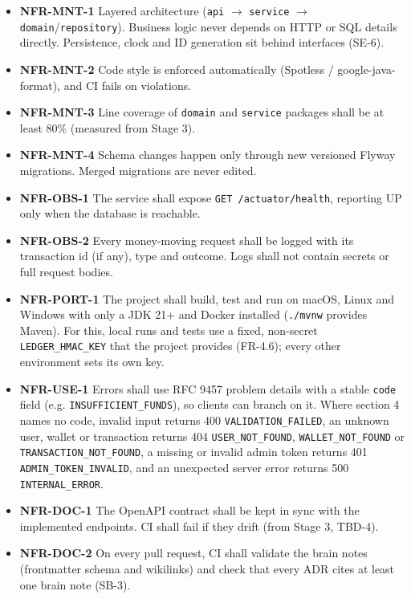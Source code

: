 \documentclass[11pt,a4paper]{article}
\providecommand{\tightlist}{\setlength{\itemsep}{2pt}\setlength{\parskip}{0pt}}
\begin{document}
\begin{itemize}
\tightlist
\item
  \textbf{NFR-MNT-1} Layered architecture (\texttt{api} \ensuremath{\rightarrow} \texttt{service} \ensuremath{\rightarrow} \texttt{domain}/\texttt{repository}). Business logic
  never depends on HTTP or SQL details directly. Persistence, clock and ID generation sit behind
  interfaces (SE-6).
\item
  \textbf{NFR-MNT-2} Code style is enforced automatically (Spotless / google-java-format), and CI fails
  on violations.
\item
  \textbf{NFR-MNT-3} Line coverage of \texttt{domain} and \texttt{service} packages shall be at least 80\% (measured
  from Stage 3).
\item
  \textbf{NFR-MNT-4} Schema changes happen only through new versioned Flyway migrations. Merged
  migrations are never edited.
\item
  \textbf{NFR-OBS-1} The service shall expose \texttt{GET\ /\allowbreak{}actuator/\allowbreak{}health}, reporting UP only when the
  database is reachable.
\item
  \textbf{NFR-OBS-2} Every money-moving request shall be logged with its transaction id (if any), type
  and outcome. Logs shall not contain secrets or full request bodies.
\item
  \textbf{NFR-PORT-1} The project shall build, test and run on macOS, Linux and Windows with only a JDK
  21+ and Docker installed (\texttt{./\allowbreak{}mvnw} provides Maven). For this, local runs and tests use a fixed,
  non-secret \texttt{LEDGER\_\allowbreak{}HMAC\_\allowbreak{}KEY} that the project provides (FR-4.6); every other environment sets
  its own key.
\item
  \textbf{NFR-USE-1} Errors shall use RFC 9457 problem details with a stable \texttt{code} field (e.g.
  \texttt{INSUFFICIENT\_\allowbreak{}FUNDS}), so clients can branch on it. Where section 4 names no code, invalid input
  returns 400 \texttt{VALIDATION\_\allowbreak{}FAILED}, an unknown user, wallet or transaction returns 404
  \texttt{USER\_\allowbreak{}NOT\_\allowbreak{}FOUND}, \texttt{WALLET\_\allowbreak{}NOT\_\allowbreak{}FOUND} or \texttt{TRANSACTION\_\allowbreak{}NOT\_\allowbreak{}FOUND}, a missing or invalid admin token
  returns 401 \texttt{ADMIN\_\allowbreak{}TOKEN\_\allowbreak{}INVALID}, and an unexpected server error returns 500 \texttt{INTERNAL\_\allowbreak{}ERROR}.
\item
  \textbf{NFR-DOC-1} The OpenAPI contract shall be kept in sync with the implemented endpoints. CI shall
  fail if they drift (from Stage 3, TBD-4).
\item
  \textbf{NFR-DOC-2} On every pull request, CI shall validate the brain notes (frontmatter schema and
  wikilinks) and check that every ADR cites at least one brain note (SB-3).
\end{itemize}
\end{document}
